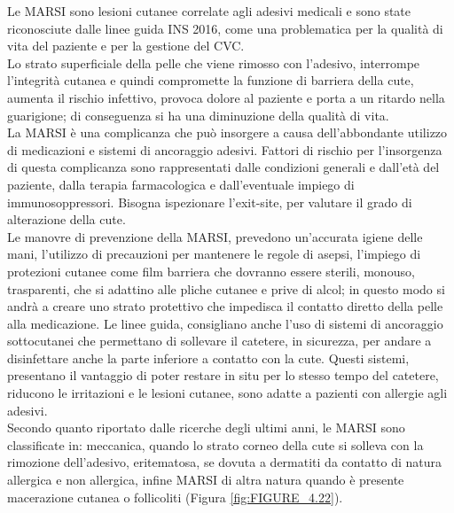 Le MARSI sono lesioni cutanee correlate agli adesivi medicali e sono state riconosciute dalle linee guida INS 2016,
come una problematica per la qualità di vita del paziente e per la gestione del CVC\cite{AIOMCVC}.\\
Lo strato superficiale della pelle che viene rimosso con l’adesivo, interrompe l’integrità cutanea e quindi 
compromette la funzione di barriera della cute, aumenta il rischio infettivo, provoca dolore al paziente e porta
a un ritardo nella guarigione; di conseguenza si ha una diminuzione della qualità di vita\cite{EMODIAL}.\\
La MARSI è una complicanza che può insorgere a causa dell’abbondante utilizzo di medicazioni e sistemi di ancoraggio 
adesivi. Fattori di rischio per l’insorgenza di questa complicanza sono rappresentati dalle condizioni generali e 
dall'età del paziente, dalla terapia farmacologica e dall’eventuale impiego di immunosoppressori. Bisogna ispezionare 
l’exit-site, per valutare il grado di alterazione della cute.\\ 
Le manovre di prevenzione della MARSI, prevedono un’accurata igiene delle mani, l’utilizzo di precauzioni per 
mantenere le regole di asepsi, l’impiego di protezioni cutanee come film barriera che dovranno essere sterili, 
monouso, trasparenti, che si adattino alle pliche cutanee e prive di alcol; in questo modo si andrà a creare uno 
strato protettivo che impedisca il contatto diretto della pelle alla medicazione. Le linee guida, consigliano anche 
l’uso di sistemi di ancoraggio sottocutanei che permettano di sollevare il catetere, in sicurezza, per andare a 
disinfettare anche la parte inferiore a contatto con la cute. Questi sistemi, presentano il vantaggio di poter restare 
in situ per lo stesso tempo del catetere, riducono le irritazioni e le lesioni cutanee, sono adatte a pazienti con 
allergie agli adesivi\cite{AIOMCVC}.\\
Secondo quanto riportato dalle ricerche degli ultimi anni, le MARSI sono classificate in:  meccanica, 
quando lo strato corneo della cute si solleva con la rimozione dell’adesivo, eritematosa, se dovuta a dermatiti da 
contatto di natura allergica e non allergica, infine MARSI di altra natura quando è presente macerazione cutanea o 
follicoliti (Figura \ref{fig:FIGURE_4.22})\cite{EMODIAL}.

